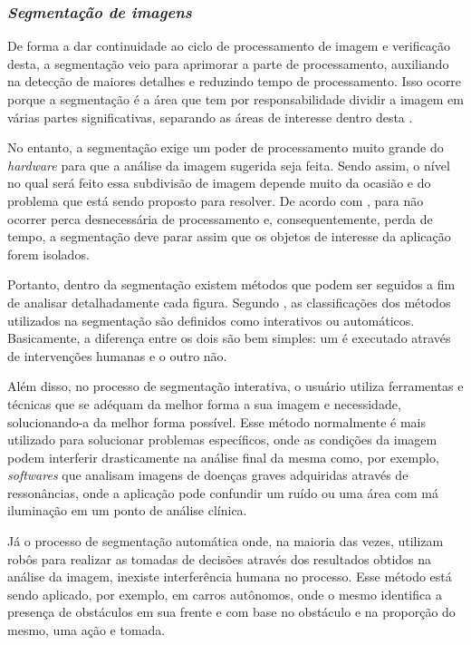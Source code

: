 \subsubsection{\textit{Segmentação de imagens}}

De forma a dar continuidade ao ciclo de processamento de imagem e verificação desta, a segmentação veio para aprimorar a parte de processamento, auxiliando na detecção de maiores detalhes e reduzindo tempo de processamento. Isso ocorre porque a segmentação é a área que tem por responsabilidade dividir a imagem em várias partes significativas, separando as áreas de interesse dentro desta \cite{FILHO1999}.

No entanto, a segmentação exige um poder de processamento muito grande do \textit{hardware} para que a análise da imagem sugerida seja feita. Sendo assim, o nível no qual será feito essa subdivisão de imagem depende muito da ocasião e do problema que está sendo proposto para resolver. De acordo com , para não ocorrer perca desnecessária de processamento e, consequentemente, perda de tempo, a segmentação deve parar assim que os objetos de interesse da aplicação forem isolados.

Portanto, dentro da segmentação existem métodos que podem ser seguidos a fim de analisar detalhadamente cada figura. Segundo , as classificações dos métodos utilizados na segmentação são definidos como interativos ou automáticos. Basicamente, a diferença entre os dois são bem simples: um é executado através de intervenções humanas e o outro não.

Além disso, no processo de segmentação interativa, o usuário utiliza ferramentas e técnicas que se adéquam da melhor forma a sua imagem e necessidade, solucionando-a da melhor forma possível. Esse método normalmente é mais utilizado para solucionar problemas específicos, onde as condições da imagem podem interferir drasticamente na análise final da mesma como, por exemplo, \textit{softwares} que analisam imagens de doenças graves adquiridas através de ressonâncias, onde a aplicação pode confundir um ruído ou uma área com má iluminação em um ponto de análise clínica.

Já o processo de segmentação automática onde, na maioria das vezes, utilizam robôs para realizar as tomadas de decisões através dos resultados obtidos na análise da imagem, inexiste interferência humana no processo. Esse método está sendo aplicado, por exemplo, em carros autônomos, onde o mesmo identifica a presença de obstáculos em sua frente e com base no obstáculo e na proporção do mesmo, uma ação e tomada.

